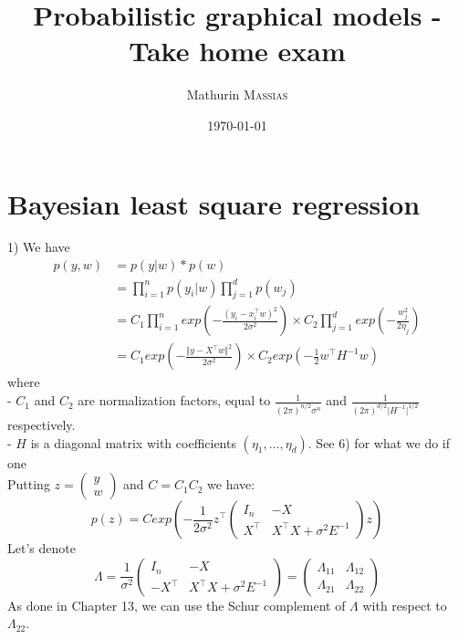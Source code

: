 \documentclass[11pt,a4paper]{article}
\begin{document}
	\title{Probabilistic graphical models - Take home exam}
	\author{Mathurin \textsc{Massias}}
	\date{\today} 
	\maketitle
\hspace{-6mm}

\section{Bayesian least square regression}

1) We have 
$$ \begin{aligned}p(y, w) 
&= p(y \vert w) * p(w) 
\\&= \prod\limits_{i=1}^{n} p(y_i \vert w) \prod\limits_{j=1}^{d} p( w_j)  
\\&=C_1 \prod\limits_{i=1}^{n} exp(- \frac{( y_i - x_i^{\top}w )^2 } {2 \sigma^2}) \times C_2 \prod\limits_{j=1}^{d} exp(- \frac{w_j^2}{2 \eta_j})
\\&=C_1 exp(- \frac{\Vert y- X^{\top}w \Vert^2 } {2 \sigma^2}) \times C_2 exp(-\frac{1}{2} w^{\top} H ^{-1} w)
\end{aligned}$$
where 
\\- $C_1$ and $C_2$ are normalization factors, equal to $\frac{1}{(2\pi)^{n/2} \sigma^n}$ and $\frac{1}{(2 \pi)^{d/2} \vert H^{-1} \vert^{1/2}}$ respectively.
\\- $H$ is a diagonal matrix with coefficients $(\eta_1, \ldots, \eta_d)$. See 6) for what we do if one
%
\\[5mm]Putting $z = \begin{pmatrix} y \\ w \end{pmatrix}$ and $C = C_1C_2$ we have:
$$p(z) = C exp (-\frac{1}{2\sigma^2} z^{\top} 
\begin{pmatrix} I_n & -X
\\ X^{\top} & X^{\top}X + \sigma^2 E^{-1} \end{pmatrix}
z)$$
%
Let's denote $$\Lambda = \frac{1}{\sigma^2}\begin{pmatrix} I_n & -X
\\ -X^{\top} & X^{\top}X + \sigma^2 E^{-1} \end{pmatrix}
 = \begin{pmatrix} \Lambda_{11} & \Lambda_{12}
\\ \Lambda_{21} & \Lambda_{22}  \end{pmatrix}
$$
As done in Chapter 13, we can use the Schur complement of $\Lambda$ with respect to $\Lambda_{22}$.
\end{document}
